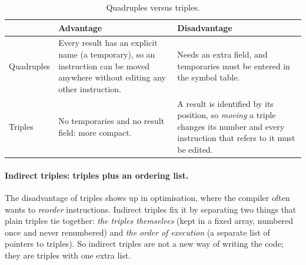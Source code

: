 \documentclass[11pt,a4paper]{article}
\begin{document}
\begin{table}[htbp]
\centering
\small
\begin{tabular}{@{}L{2.6cm} L{5.6cm} L{5.6cm}@{}}
\toprule
 & \textbf{Advantage} & \textbf{Disadvantage} \\ \midrule
Quadruples & Every result has an explicit name (a temporary), so an instruction can be moved anywhere without editing any other instruction. & Needs an extra field, and temporaries must be entered in the symbol table. \\
Triples & No temporaries and no result field: more compact. & A result is identified by its position, so \emph{moving} a triple changes its number and every instruction that refers to it must be edited. \\ \bottomrule
\end{tabular}
\caption{Quadruples versus triples.}
\end{table}

\paragraph{Indirect triples: triples plus an ordering list.} The disadvantage of triples shows up in optimisation, where the compiler often wants to \emph{reorder} instructions. Indirect triples fix it by separating two things that plain triples tie together: \emph{the triples themselves} (kept in a fixed array, numbered once and never renumbered) and \emph{the order of execution} (a separate list of pointers to triples). So indirect triples are not a new way of writing the code; they are triples with one extra list.
\end{document}
